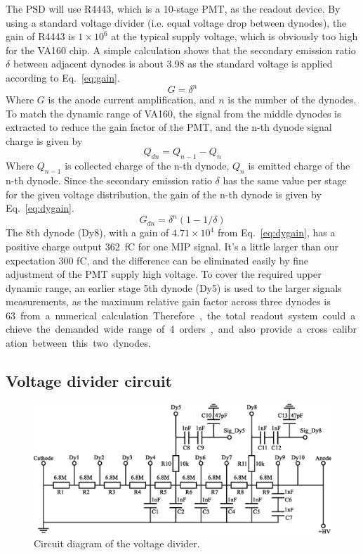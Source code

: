 \documentclass[preprint, times]{elsarticle}
\begin{document}
The PSD will use R4443, which is a 10-stage PMT, as the readout device. By using a standard voltage divider (i.e. equal voltage drop between dynodes), the gain of R4443 is $1\times10^6$ at the typical supply voltage, which is obviously too high for the VA160 chip. A simple calculation shows that the secondary emission ratio $\delta$ between adjacent dynodes is about 3.98 as the standard voltage is applied according to Eq.~\ref{eq:gain}.
\begin{equation}
G=\delta^{n}
\label{eq:gain}
\end{equation}
Where $G$ is the anode current amplification, and $n$ is the number of the dynodes. To match the dynamic range of VA160, the signal from the middle dynodes is extracted to reduce the gain factor of the PMT, and the n-th dynode signal charge is given by
\begin{equation}
Q_{dn}=Q_{n-1}-Q_{n}
\label{eq:dycharge}
\end{equation}
Where $Q_{n-1}$ is collected charge of the n-th dynode, $Q_{n}$ is emitted charge of the n-th dynode. Since the secondary emission ratio $\delta$ has the same value per stage for the given voltage distribution, the gain of the n-th dynode is given by Eq.~\ref{eq:dygain}.
\begin{equation}
G_{dn}=\delta^{n}(1-1/\delta)
\label{eq:dygain}
\end{equation}
The 8th dynode (Dy8), with a gain of $4.71\times10^4$ from Eq.~\ref{eq:dygain}, has a positive charge output \SI{362} {\femto\coulomb} for one MIP signal. It's a little larger than our expectation 300 fC, and the difference can be eliminated easily by fine adjustment of the PMT supply high voltage. To cover the required upper dynamic range, an earlier stage 5th dynode (Dy5) is used to the larger signals measurements, as the maximum relative gain factor across three dynodes is \SI{63} from a numerical calculation. Therefore, the total readout system could achieve the demanded wide range of 4 orders, and also provide a cross calibration between this two dynodes.

\subsection{Voltage divider circuit}
\label{sec:divider_design}

\begin{figure}
\centering
 \includegraphics[width=130mm]{divider}
\caption{Circuit diagram of the voltage divider.}
\label{fig:divider}
\end{figure}
\end{document}

